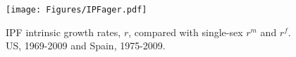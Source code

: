 \begin{figure}[ht!]
        \centering  
          \caption{IPF intrinsic growth rates, $r$, compared with
          single-sex $r^m$ and $r^f$. US, 1969-2009 and Spain, 1975-2009.}
           \texttt{[image: Figures/IPFager.pdf]}
          \label{fig:IPFager}
\end{figure}




\FloatBarrier

